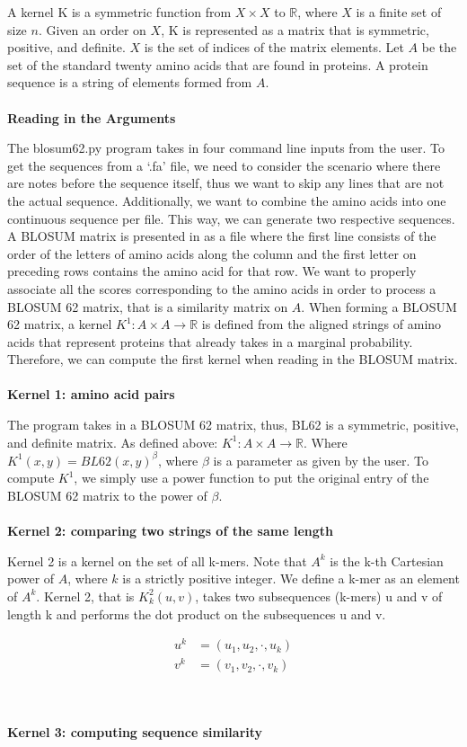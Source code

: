 \documentclass{article}
\begin{document}
A kernel K is a symmetric function from $X \times X$ to $\mathbb{R}$, where $X$ is a finite set of size $n$. Given an order on $X$, K is represented as a matrix that is symmetric, positive, and definite. $X$ is the set of indices of the matrix elements. Let $A$ be the set of the standard twenty amino acids that are found in proteins. A protein sequence is a string of elements formed from $A$.
\\\\
\textbf{Reading in the Arguments}

The blosum62.py program takes in four command line inputs from the user. To get the sequences from a ‘.fa’ file, we need to consider the scenario where there are notes before the sequence itself, thus we want to skip any lines that are not the actual sequence. Additionally, we want to combine the amino acids into one continuous sequence per file. This way, we can generate two respective sequences. 
A BLOSUM matrix is presented in as a file where the first line consists of the order of the letters of amino acids along the column and the first letter on preceding rows contains the amino acid for that row. We want to properly associate all the scores corresponding to the amino acids in order to process a BLOSUM 62 matrix, that is a similarity matrix on $A$. When forming a BLOSUM 62 matrix, a kernel $K^1 \colon A \times A \to \mathbb{R}$ is defined from the aligned strings of amino acids that represent proteins that already takes in a marginal probability. Therefore, we can compute the first kernel when reading in the BLOSUM matrix. \\\\
\textbf{Kernel 1: amino acid pairs} 

The program takes in a BLOSUM 62 matrix, thus, BL62 is a symmetric, positive, and definite matrix. 
As defined above: $K^1 \colon A \times A \to \mathbb{R}$. Where $K^1(x, y) = BL62(x, y)^β$, where $\beta$ is a parameter as given by the user. To compute $K^1$, we simply use a power function to put the original entry of the BLOSUM 62 matrix to the power of $\beta$. 
\\\\
\textbf{Kernel 2: comparing two strings of the same length}

Kernel 2 is a kernel on the set of all k-mers. Note that $A^k$ is the k-th Cartesian power of $A$, where $k$ is a strictly positive integer. We define a k-mer as an element of $A^k$. 
Kernel 2,  that is $K^2_k (u, v)$, takes two subsequences (k-mers) u and v of length k and performs the dot product on the subsequences u and v.
\begin{center}
\begin{align*} 
u^k &=  (u_1, u_2, \cdot, u_k) \\ 
v^k &=  (v_1, v_2, \cdot, v_k)
\end{align*}
\end{center}
\\\\
\textbf{Kernel 3: computing sequence similarity}
\end{document}
